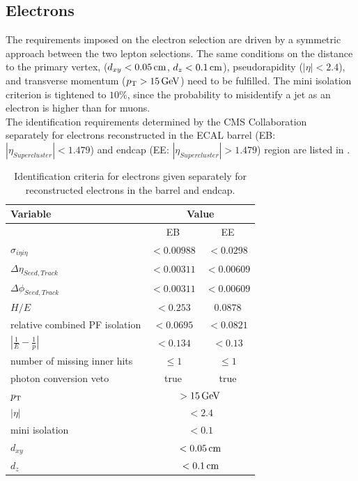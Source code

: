 \subsection{Electrons}
The requirements imposed on the electron selection are driven by a symmetric approach between the two lepton selections. The same conditions on the distance to the primary vertex, ($d_{xy}<0.05\,\text{cm}$, $d_z<0.1\,\text{cm}$), pseudorapidity ($|\eta|<2.4$), and transverse momentum ($p_{\mathrm{T}}>15\,\text{Ge\hspace{-.08em}V}$) need to be fulfilled. The mini isolation criterion is tightened to $10\%$, since the probability to misidentify a jet as an electron is higher than for muons.\\
The identification requirements determined by the CMS Collaboration~\cite{ElectronID} separately for electrons reconstructed in the ECAL barrel (EB: $|\eta_{Supercluster}|<1.479$) and endcap (EE: $|\eta_{Supercluster}|>1.479$) region are listed in .
\begin{table}[bp]
 \centering
 \caption{Identification criteria for electrons given separately for reconstructed electrons in the barrel and endcap.}
 \label{tab:eleID}
 \begin{tabular}{lcc}
  Variable                       & \multicolumn{2}{c}{Value}                   \\\hline
                                 & EB                             & EE         \\\hline
  $\sigma_{i\eta i\eta}$         & $<0.00988$                     & $<0.0298$  \\
  $\Delta\eta_{Seed,Track}$      & $<0.00311$                     & $<0.00609$ \\
  $\Delta\phi_{Seed,Track}$      & $<0.00311$                     & $<0.00609$ \\
  $H/E$                          & $<0.253$                       & $0.0878$   \\
  relative combined PF isolation & $<0.0695$                      & $<0.0821$  \\
  $|\frac{1}{E}-\frac{1}{p}|$    & $<0.134$                       & $<0.13$    \\
  number of missing inner hits   & $\leq1$                        & $\leq1$    \\
  photon conversion veto         & true                           & true       \\\hline
  $p_{\mathrm{T}}$                          & \multicolumn{2}{c}{$>15\,\text{Ge\hspace{-.08em}V}$}               \\
  $|\eta|$                       & \multicolumn{2}{c}{$<2.4$}                  \\
  mini isolation                 & \multicolumn{2}{c}{$<0.1$}                  \\
  $d_{xy}$                       & \multicolumn{2}{c}{$<0.05\,\text{cm}$}              \\
  $d_z$                          & \multicolumn{2}{c}{$<0.1\,\text{cm}$}               \\\hline
 \end{tabular}
 \vspace{\baselineskip}
\end{table}
